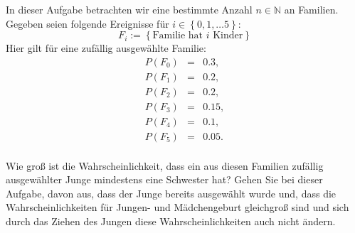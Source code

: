 \begin{Exercise}
	In dieser Aufgabe betrachten wir eine bestimmte Anzahl $n\in\mathbb{N}$ an Familien. Gegeben seien folgende Ereignisse für $i\in\left\lbrace 0,1,\dots 5\right\rbrace$:
	\begin{equation*}
		F_i:=\left\lbrace \text{Familie hat } i \text{ Kinder}\right\rbrace
	\end{equation*} 
	Hier gilt für eine zufällig ausgewählte Familie:
	\begin{eqnarray*}
		P(F_0)&=&0.3,\\
		P(F_1)&=&0.2,\\
		P(F_2)&=&0.2,\\
		P(F_3)&=&0.15,\\
		P(F_4)&=&0.1,\\
		P(F_5)&=&0.05.
	\end{eqnarray*}\\
	Wie groß ist die Wahrscheinlichkeit, dass ein aus diesen Familien zufällig ausgewählter Junge mindestens eine Schwester hat? Gehen Sie bei dieser Aufgabe, davon aus, dass der Junge bereits ausgewählt wurde und, dass die Wahrscheinlichkeiten für Jungen- und Mädchengeburt gleichgroß sind und sich durch das Ziehen des Jungen diese Wahrscheinlichkeiten auch nicht ändern.
\end{Exercise}
